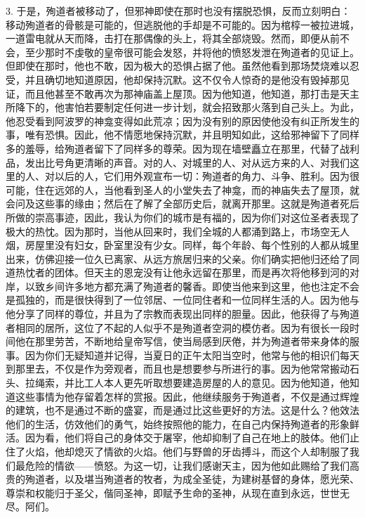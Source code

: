 3. 于是，殉道者被移动了，但邪神即使在那时也没有摆脱恐惧，反而立刻明白：移动殉道者的骨骸是可能的，但逃脱他的手却是不可能的。因为棺椁一被拉进城，一道雷电就从天而降，击打在那偶像的头上，将其全部烧毁。然而，即便从前不会，至少那时不虔敬的皇帝很可能会发怒，并将他的愤怒发泄在殉道者的见证上。但即使在那时，他也不敢，因为极大的恐惧占据了他。虽然他看到那场焚烧难以忍受，并且确切地知道原因，他却保持沉默。这不仅令人惊奇的是他没有毁掉那见证，而且他甚至不敢再次为那神庙盖上屋顶。因为他知道，他知道，那打击是天主所降下的，他害怕若要制定任何进一步计划，就会招致那火落到自己头上。为此，他忍受看到阿波罗的神龛变得如此荒凉；因为没有别的原因使他没有纠正所发生的事，唯有恐惧。因此，他不情愿地保持沉默，并且明知如此，这给邪神留下了同样多的羞辱，给殉道者留下了同样多的尊荣。因为现在墙壁矗立在那里，代替了战利品，发出比号角更清晰的声音。对的人、对城里的人、对从远方来的人、对我们这里的人、对以后的人，它们用外观宣布一切：殉道者的角力、斗争、胜利。因为很可能，住在远郊的人，当他看到圣人的小堂失去了神龛，而的神庙失去了屋顶，就会问及这些事的缘由；然后在了解了全部历史后，就离开那里。这就是殉道者死后所做的崇高事迹，因此，我认为你们的城市是有福的，因为你们对这位圣者表现了极大的热忱。因为那时，当他从回来时，我们全城的人都涌到路上，市场空无人烟，房屋里没有妇女，卧室里没有少女。同样，每个年龄、每个性别的人都从城里出来，仿佛迎接一位久已离家、从远方旅居归来的父亲。你们确实把他归还给了同道热忱者的团体。但天主的恩宠没有让他永远留在那里，而是再次将他移到河的对岸，以致乡间许多地方都充满了殉道者的馨香。即使当他来到这里，他也注定不会是孤独的，而是很快得到了一位邻居、一位同住者和一位同样生活的人。因为他与他分享了同样的尊位，并且为了宗教而表现出同样的胆量。因此，他获得了与殉道者相同的居所，这位了不起的人似乎不是殉道者空洞的模仿者。因为有很长一段时间他在那里劳苦，不断地给皇帝写信，使当局感到厌倦，并为殉道者带来身体的服事。因为你们无疑知道并记得，当夏日的正午太阳当空时，他常与他的相识们每天到那里去，不仅是作为旁观者，而且也是想要参与所进行的事。因为他常常搬动石头、拉绳索，并比工人本人更先听取想要建造房屋的人的意见。因为他知道，他知道这些事情为他存留着怎样的赏报。因此，他继续服务于殉道者，不仅是通过辉煌的建筑，也不是通过不断的盛宴，而是通过比这些更好的方法。这是什么？他效法他们的生活，仿效他们的勇气，始终按照他的能力，在自己内保持殉道者的形象鲜活。因为看，他们将自己的身体交于屠宰，他却抑制了自己在地上的肢体。他们止住了火焰，他却熄灭了情欲的火焰。他们与野兽的牙齿搏斗，而这个人却制服了我们最危险的情欲——愤怒。为这一切，让我们感谢天主，因为他如此赐给了我们高贵的殉道者，以及堪当殉道者的牧者，为成全圣徒，为建树基督的身体，愿光荣、尊崇和权能归于圣父，偕同圣神，即赋予生命的圣神，从现在直到永远，世世无尽。阿们。\par

